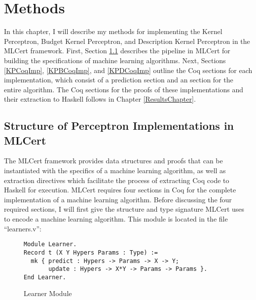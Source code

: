 \chapter{Methods}\label{MethodsChapter}
In this chapter, I will describe my methods for implementing the Kernel Perceptron, Budget Kernel Perceptron, and Description Kernel Perceptron in the MLCert framework. First, Section \ref{MLCertStruct} describes the pipeline in MLCert for building the specifications of machine learning algorithms. Next, Sections \ref{KPCoqImp}, \ref{KPBCoqImp}, and \ref{KPDCoqImp} outline the Coq sections for each implementation, which consist of a prediction section and an section for the entire algorithm. The Coq sections for the proofs of these implementations and their extraction to Haskell follows in Chapter \ref{ResultsChapter}.
\section{Structure of Perceptron Implementations in MLCert}\label{MLCertStruct}
The MLCert framework provides data structures and proofs that can be instantiated with the specifics of a machine learning algorithm, as well as extraction directives which facilitate the process of extracting Coq code to Haskell for execution. MLCert requires four sections in Coq for the complete implementation of a machine learning algorithm. Before discussing the four required sections, I will first give the structure and type signature MLCert uses to encode a machine learning algorithm. This module is located in the file ``learners.v'':

\begin{figure}
    \caption{Learner Module}
    \label{LearnerDef}
    \begin{lstlisting}
Module Learner.
Record t (X Y Hypers Params : Type) :=
  mk { predict : Hypers -> Params -> X -> Y;
       update : Hypers -> X*Y -> Params -> Params }.
End Learner.
    \end{lstlisting}
\end{figure}

